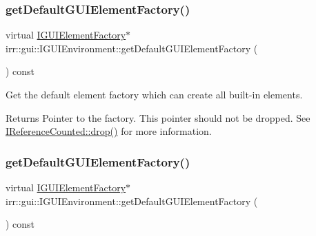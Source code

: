 \subsubsection{\texorpdfstring{get\+Default\+G\+U\+I\+Element\+Factory()}{getDefaultGUIElementFactory()}\hspace{0.1cm}{\footnotesize\ttfamily [1/2]}}
{\footnotesize\ttfamily virtual \hyperlink{classirr_1_1gui_1_1IGUIElementFactory}{I\+G\+U\+I\+Element\+Factory}$\ast$ irr\+::gui\+::\+I\+G\+U\+I\+Environment\+::get\+Default\+G\+U\+I\+Element\+Factory (\begin{DoxyParamCaption}{ }\end{DoxyParamCaption}) const\hspace{0.3cm}{\ttfamily [pure virtual]}}



Get the default element factory which can create all built-\/in elements. 

\begin{DoxyReturn}{Returns}
Pointer to the factory. This pointer should not be dropped. See \hyperlink{classirr_1_1IReferenceCounted_a03856a09355b89d178090c4a5f738543}{I\+Reference\+Counted\+::drop()} for more information. 
\end{DoxyReturn}
\mbox{\label{classirr_1_1gui_1_1IGUIEnvironment_a13ec41a31e1b9cdc317c0c6092c2b820}} 
\subsubsection{\texorpdfstring{get\+Default\+G\+U\+I\+Element\+Factory()}{getDefaultGUIElementFactory()}\hspace{0.1cm}{\footnotesize\ttfamily [2/2]}}
{\footnotesize\ttfamily virtual \hyperlink{classirr_1_1gui_1_1IGUIElementFactory}{I\+G\+U\+I\+Element\+Factory}$\ast$ irr\+::gui\+::\+I\+G\+U\+I\+Environment\+::get\+Default\+G\+U\+I\+Element\+Factory (\begin{DoxyParamCaption}{ }\end{DoxyParamCaption}) const\hspace{0.3cm}{\ttfamily [pure virtual]}}



